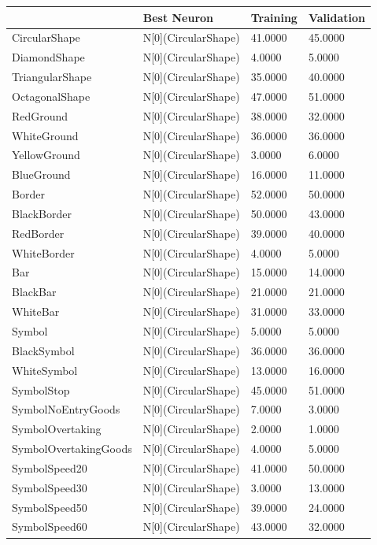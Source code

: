 \begin{tabular}{llll}
\toprule
 & Best Neuron & Training & Validation \\
\midrule
CircularShape & N[0](CircularShape) & 41.0000 & 45.0000 \\
DiamondShape & N[0](CircularShape) & 4.0000 & 5.0000 \\
TriangularShape & N[0](CircularShape) & 35.0000 & 40.0000 \\
OctagonalShape & N[0](CircularShape) & 47.0000 & 51.0000 \\
RedGround & N[0](CircularShape) & 38.0000 & 32.0000 \\
WhiteGround & N[0](CircularShape) & 36.0000 & 36.0000 \\
YellowGround & N[0](CircularShape) & 3.0000 & 6.0000 \\
BlueGround & N[0](CircularShape) & 16.0000 & 11.0000 \\
Border & N[0](CircularShape) & 52.0000 & 50.0000 \\
BlackBorder & N[0](CircularShape) & 50.0000 & 43.0000 \\
RedBorder & N[0](CircularShape) & 39.0000 & 40.0000 \\
WhiteBorder & N[0](CircularShape) & 4.0000 & 5.0000 \\
Bar & N[0](CircularShape) & 15.0000 & 14.0000 \\
BlackBar & N[0](CircularShape) & 21.0000 & 21.0000 \\
WhiteBar & N[0](CircularShape) & 31.0000 & 33.0000 \\
Symbol & N[0](CircularShape) & 5.0000 & 5.0000 \\
BlackSymbol & N[0](CircularShape) & 36.0000 & 36.0000 \\
WhiteSymbol & N[0](CircularShape) & 13.0000 & 16.0000 \\
SymbolStop & N[0](CircularShape) & 45.0000 & 51.0000 \\
SymbolNoEntryGoods & N[0](CircularShape) & 7.0000 & 3.0000 \\
SymbolOvertaking & N[0](CircularShape) & 2.0000 & 1.0000 \\
SymbolOvertakingGoods & N[0](CircularShape) & 4.0000 & 5.0000 \\
SymbolSpeed20 & N[0](CircularShape) & 41.0000 & 50.0000 \\
SymbolSpeed30 & N[0](CircularShape) & 3.0000 & 13.0000 \\
SymbolSpeed50 & N[0](CircularShape) & 39.0000 & 24.0000 \\
SymbolSpeed60 & N[0](CircularShape) & 43.0000 & 32.0000 \\

\end{tabular}
